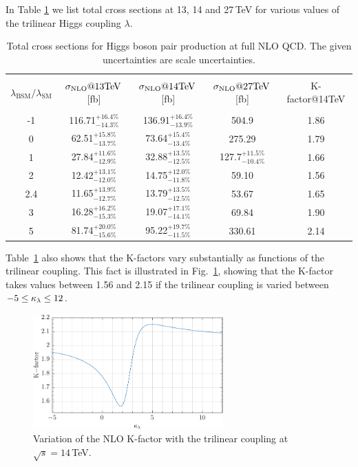 In Table \ref{tab:sigmatot} we list total cross sections at 13, 14 and 27\,TeV for various values of the trilinear Higgs coupling $\lambda$. 
\begin{table}[htb]
\begin{center}
\begin{tabular}{| c | c | c |c|c|}
\hline
&&&&\\
$\lambda_{\mathrm{BSM}}/\lambda_{\mathrm{SM}}$ & $\sigma_{\rm{NLO}}@13 \mathrm{TeV}$\,[fb]& $\sigma_{\rm{NLO}}@14 \mathrm{TeV}$\,[fb] & $\sigma_{\rm{NLO}}@27 \mathrm{TeV}$\,[fb] &K-factor@14TeV\\
&&&&\\
\hline
-1& 116.71$^{+16.4\%}_{-14.3\%}$  & 136.91$^{+16.4\%}_{-13.9\%}$& 504.9 & 1.86 \\
\hline
0& 62.51$^{+15.8\%}_{-13.7\%}$ & 73.64$^{+15.4\%}_{-13.4\%}$& 275.29& 1.79  \\
\hline 
1& 27.84$^{+11.6\%}_{-12.9\%}$ & 32.88$^{+13.5\%}_{-12.5\%}$&127.7$^{+11.5\%}_{-10.4\%}$ &1.66\\
\hline
2 & 12.42$^{+13.1\%}_{-12.0\%}$ & 14.75$^{+12.0\%}_{-11.8\%}$ &  59.10 & 1.56 \\
\hline
2.4& 11.65$^{+13.9\%}_{-12.7\%}$ & 13.79$^{+13.5\%}_{-12.5\%}$& 53.67 & 1.65 \\
\hline
3& 16.28$^{+16.2\%}_{-15.3\%}$ & 19.07$^{+17.1\%}_{-14.1\%}$ & 69.84 & 1.90 \\
\hline 
5& 81.74$^{+20.0\%}_{-15.6\%}$  & 95.22$^{+19.7\%}_{-11.5\%}$& 330.61 & 2.14 \\
\hline 
\end{tabular}
\end{center}
\caption{Total cross sections for Higgs boson pair production at full NLO QCD. The given uncertainties are scale uncertainties. 
\label{tab:sigmatot}}
\end{table}
Table~\ref{tab:sigmatot} also shows that the K-factors vary substantially as functions of the trilinear coupling.
This fact is illustrated in Fig.~\ref{fig:Kfacvariation}, showing that the K-factor takes values between 1.56 and 2.15
if the trilinear coupling is varied between $-5\leq \kappa_{\lambda}\leq 12$.

\begin{figure}[htb]
  \centering
    \includegraphics[width=0.65\textwidth]{plots/Kfactor.pdf}
\caption{Variation of the NLO K-factor with the trilinear coupling at $\sqrt{s}=14$\,TeV.}
\label{fig:Kfacvariation}
\end{figure}



